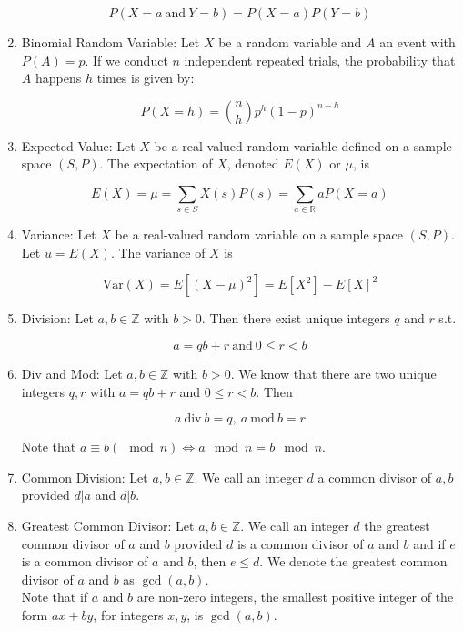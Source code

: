 \documentclass{article}
\begin{document}
\begin{enumerate}
		\[P(X=a\: \text{and} \: Y=b)=P(X=a)P(Y=b)\]
		
		\item Binomial Random Variable: Let $X$ be a random variable and $A$ an event with $P(A)=p$.
		If we conduct $n$ independent repeated trials, the probability that $A$ happens $h$ times is given by:
		
		\[P(X=h)= {n \choose h} p^h(1-p)^{n-h}\]
		
		\item Expected Value: Let $X$ be a real-valued random variable defined on a sample space $(S,P)$.
		The expectation of $X$, denoted $E(X)$ or $\mu$, is
		
		\[E(X)=\mu=\sum_{s\in S}X(s)P(s)=\sum_{a\in\mathbb{R}}aP(X=a)\]
		
		\item Variance: Let $X$ be a real-valued random variable on a sample space $(S,P)$.
		Let $u=E(X)$.
		The variance of $X$ is
		
		\[\text{Var}(X)=E[(X-\mu)^2]=E[X^2]-E[X]^2\]
		
		\item Division: Let $a,b\in\mathbb{Z}$ with $b>0$.
		Then there exist unique integers $q$ and $r$ s.t.
		
		\[a=qb+r \: \text{and} \: 0\leq r<b\]
		
		\item Div and Mod: Let $a,b\in\mathbb{Z}$ with $b>0$.
		We know that there are two unique integers $q,r$ with $a=qb+r$ and $0\leq r<b$.
		Then
		
		\[a \:\text{div}\:b=q,\: a \:\text{mod}\: b=r\]
		
		Note that $a\equiv b (\mod n) \Longleftrightarrow a\mod n=b\mod n$.
		
		\item Common Division: Let $a,b\in\mathbb{Z}$.
		We call an integer $d$ a common divisor of $a,b$ provided $d|a$ and $d|b$.
		
		\item Greatest Common Divisor: Let $a,b\in\mathbb{Z}$.
		We call an integer $d$ the greatest common divisor of $a$ and $b$ provided $d$ is a common divisor of $a$ and $b$ and if $e$ is a common divisor of $a$ and $b$, then $e\leq d$.
		We denote the greatest common divisor of $a$ and $b$ as $\gcd(a,b)$.\\
		
		Note that if $a$ and $b$ are non-zero integers, the smallest positive integer of the form $ax+by$, for integers $x,y$, is $\gcd(a,b)$.
		

\end{enumerate}
\end{document}

